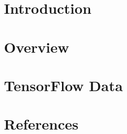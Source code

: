 \section[Intro]{Introduction}


\section[Overview]{Overview}


\section[TfData]{TensorFlow Data}


\section[Refs]{References}


